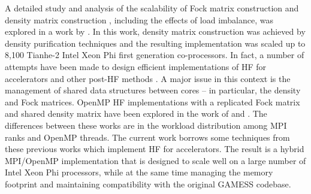 A detailed study and analysis of the scalability of Fock matrix construction and density matrix construction \cite{chow2015parallel}, including the effects of load imbalance, was explored in a work by \mbox{\citet{chow2015scaling}}. In this work, density matrix construction was achieved by density purification techniques and the resulting implementation was scaled up to 8,100 Tianhe-2 Intel Xeon Phi first generation co-processors. In fact, a number of attempts have been made to design efficient implementations of HF for accelerators \cite{asadchev2012new,chow2015scaling,ufimtsev2008quantum,ufimtsev2009quantum,wilkinson2011acceleration} and other post-HF methods \cite{apra2014efficient}. A major issue in this context is the management of shared data structures between cores -- in particular, the density and Fock matrices. OpenMP HF implementations with a replicated Fock matrix and shared density matrix have been explored in the work of \citet{ishimura2010mpi} and \citet{mironov2015quantum}. The differences between these works are in the workload distribution among MPI ranks and OpenMP threads. The current work borrows some techniques from these previous works which implement HF for accelerators. The result is a hybrid MPI/OpenMP implementation that is designed to scale well on a large number of Intel Xeon Phi processors, while at the same time managing the memory footprint and maintaining compatibility with the original GAMESS codebase.
